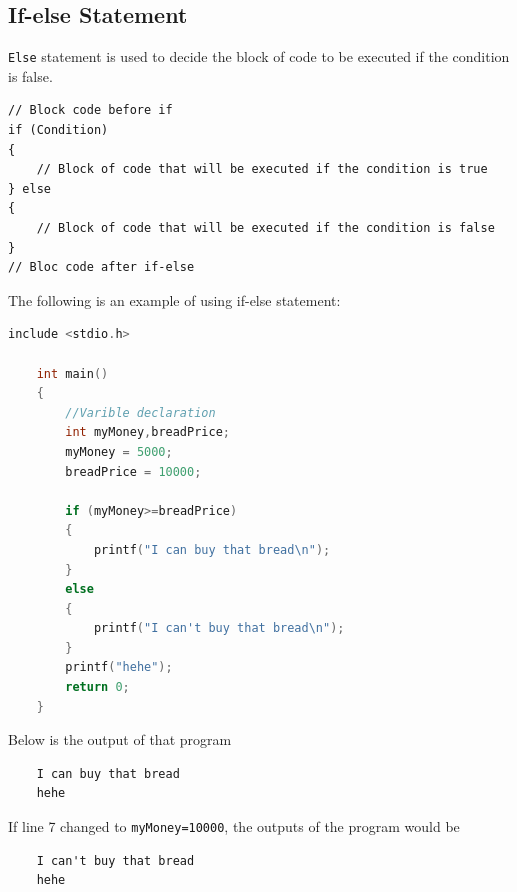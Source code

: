 \subsection{If-else Statement}
\verb|Else| statement is used to decide the block of code to be executed if the condition is false.
\begin{verbatim}
// Block code before if
if (Condition) 
{
	// Block of code that will be executed if the condition is true
} else
{
	// Block of code that will be executed if the condition is false
}
// Bloc code after if-else
\end{verbatim}
The following is an example of using if-else statement:
\begin{lstlisting}[language=c,caption = If-else example,label=lst:ifelseexample01]
	include <stdio.h>
	
	int main()
	{
		//Varible declaration
		int myMoney,breadPrice;
		myMoney = 5000;
		breadPrice = 10000;
		
		if (myMoney>=breadPrice)
		{
		    printf("I can buy that bread\n");
		}
		else
		{
	        printf("I can't buy that bread\n");	
		}
		printf("hehe");
		return 0;
	}
\end{lstlisting}
Below is the output of that program
\begin{verbatim}
    I can buy that bread
    hehe
\end{verbatim}
If line 7 changed to \verb|myMoney=10000|, the outputs of the program would be
\begin{verbatim}
    I can't buy that bread
    hehe
\end{verbatim}

